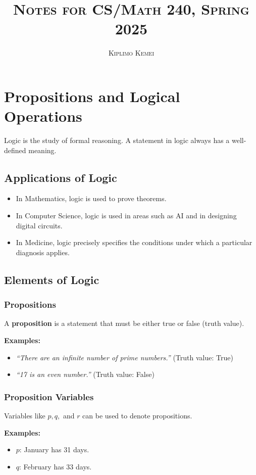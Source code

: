 \documentclass[twoside]{article}
\title{\textsc{Notes for CS/Math 240, Spring 2025}}
\author{\textsc{Kiplimo Kemei}}
\begin{document}
\maketitle

\section{Propositions and Logical Operations}
Logic is the study of formal reasoning. A statement in logic always has a well-defined meaning.

\subsection{Applications of Logic}
\begin{itemize}
    \item In Mathematics, logic is used to prove theorems.
    \item In Computer Science, logic is used in areas such as AI and in designing digital circuits.
    \item In Medicine, logic precisely specifies the conditions under which a particular diagnosis applies.
\end{itemize}

\subsection{Elements of Logic}

\subsubsection{Propositions}
A \textbf{proposition} is a statement that must be either true or false (truth value).

\textbf{Examples:}
\begin{itemize}
    \item \textit{``There are an infinite number of prime numbers.''} \quad (Truth value: True)
    \item \textit{``17 is an even number.''} \quad (Truth value: False)
\end{itemize}

\subsubsection{Proposition Variables}
Variables like $p, q,$ and $r$ can be used to denote propositions.

\textbf{Examples:}
\begin{itemize}
    \item $p$: January has 31 days.
    \item $q$: February has 33 days.
\end{itemize}
\end{document}
